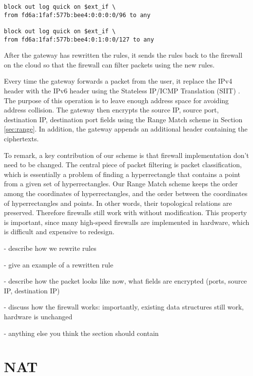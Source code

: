 \begin{lstlisting}[frame=single]
block out log quick on $ext_if \
from fd6a:1faf:577b:bee4:0:0:0:0/96 to any

block out log quick on $ext_if \
from fd6a:1faf:577b:bee4:0:1:0:0/127 to any
\end{lstlisting}


After the gateway has rewritten the rules, it sends the rules back to the firewall on the cloud so that the
firewall can filter packets using the new rules.

Every time the gateway forwards a packet from the user, it replace the IPv4 header with the IPv6 header 
using the Stateless IP/ICMP Translation (SIIT) \cite{rfc2765}. The purpose of this operation is to leave 
enough address space for avoiding address collision. The gateway then encrypts the source IP, source port, 
destination IP, destination port fields using the Range Match scheme in Section \ref{sec:range}. In addition,
the gateway appends an additional header containing the ciphertexts.


To remark, a key contribution of our scheme is that firewall implementation don't need to be changed. The central 
piece of packet filtering is packet classification, which is essentially a problem of finding a hyperrectangle 
that contains a point from a given set of hyperrectangles. Our Range Match scheme keeps the order among the coordinates 
of hyperrectangles, and the order between the coordinates of hyperrectangles and points. In other words, 
their topological relations are preserved. Therefore firewalls still work with \sys without modification. This 
property is important, since many high-speed firewalls are implemented in hardware, which is difficult and 
expensive to redesign.

- describe how we rewrite rules 

- give an example of a rewritten rule

- describe how the packet looks like now, what fields are encrypted (ports, source IP, destination IP)

- discuss how the firewall works: importantly, existing data structures still work, hardware is unchanged

- anything else you think the section should contain

\section{NAT}\label{sec:nat}


